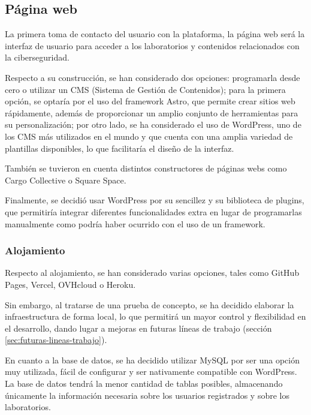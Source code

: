         \subsection{Página web}
        
            La primera toma de contacto del usuario con la plataforma, la página web será la interfaz de usuario para acceder a los laboratorios y contenidos relacionados con la ciberseguridad.
            
            Respecto a su construcción, se han considerado dos opciones: programarla desde cero o utilizar un CMS (Sistema de Gestión de Contenidos); para la primera opción, se optaría por el uso del framework Astro, que permite crear sitios web rápidamente, además de proporcionar un amplio conjunto de herramientas para su personalización; por otro lado, se ha considerado el uso de WordPress, uno de los CMS más utilizados en el mundo y que cuenta con una amplia variedad de plantillas disponibles, lo que facilitaría el diseño de la interfaz.

            También se tuvieron en cuenta distintos constructores de páginas webs como Cargo Collective o Square Space.

            Finalmente, se decidió usar WordPress por su sencillez y su biblioteca de plugins, que permitiría integrar diferentes funcionalidades extra en lugar de programarlas manualmente como podría haber ocurrido con el uso de un framework.
                
            \subsubsection{Alojamiento}
            
                Respecto al alojamiento, se han considerado varias opciones, tales como GitHub Pages, Vercel, OVHcloud o Heroku.
                
                Sin embargo, al tratarse de una prueba de concepto, se ha decidido elaborar la infraestructura de forma local, lo que permitirá un mayor control y flexibilidad en el desarrollo, dando lugar a mejoras en futuras líneas de trabajo (sección \ref{sec:futuras-lineas-trabajo}).

                En cuanto a la base de datos, se ha decidido utilizar MySQL por ser una opción muy utilizada, fácil de configurar y ser nativamente compatible con WordPress. La base de datos tendrá la menor cantidad de tablas posibles, almacenando únicamente la información necesaria sobre los usuarios registrados y sobre los laboratorios.
            
